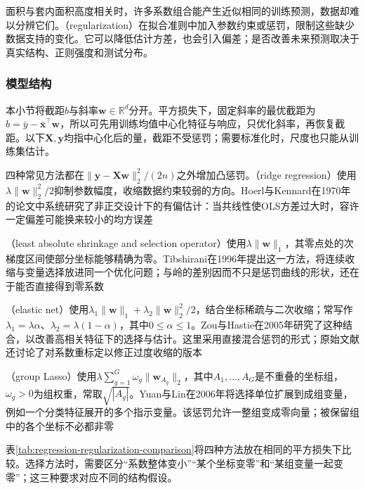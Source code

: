 面积与套内面积高度相关时，许多系数组合能产生近似相同的训练预测，数据却难以分辨它们。（regularization）在拟合准则中加入参数约束或惩罚，限制这些缺少数据支持的变化。它可以降低估计方差，也会引入偏差；是否改善未来预测取决于真实结构、正则强度和测试分布。

\subsubsection{模型结构}
\label{sec:regression-penalties}

本小节将截距$b$与斜率$\bm{w}\in\mathbb{R}^d$分开。平方损失下，固定斜率的最优截距为$b=\bar y-\bar{\bm{x}}^{\top}\bm{w}$，所以可先用训练均值中心化特征与响应，只优化斜率，再恢复截距。以下$\bm{X},\bm{y}$均指中心化后的量，截距不受惩罚；需要标准化时，尺度也只能从训练集估计。

四种常见方法都在$\lVert\bm{y}-\bm{X}\bm{w}\rVert_2^2/(2n)$之外增加凸惩罚。（ridge regression）使用$\lambda\lVert\bm{w}\rVert_2^2/2$抑制参数幅度，收缩数据约束较弱的方向。Hoerl与Kennard在1970年的论文中系统研究了非正交设计下的有偏估计：当共线性使OLS方差过大时，容许一定偏差可能换来较小的均方误差

（least absolute shrinkage and selection operator）使用$\lambda\lVert\bm{w}\rVert_1$，其零点处的次梯度区间使部分坐标能够精确为零。Tibshirani在1996年提出这一方法，将连续收缩与变量选择放进同一个优化问题；与岭的差别因而不只是惩罚曲线的形状，还在于能否直接得到零系数

（elastic net）使用$\lambda_1\lVert\bm{w}\rVert_1+\lambda_2\lVert\bm{w}\rVert_2^2/2$，结合坐标稀疏与二次收缩；常写作$\lambda_1=\lambda\alpha$、$\lambda_2=\lambda(1-\alpha)$，其中$0\leq\alpha\leq1$。Zou与Hastie在2005年研究了这种结合，以改善高相关特征下的选择与估计。这里采用直接混合惩罚的形式；原始文献还讨论了对系数重标定以修正过度收缩的版本

（group Lasso）使用$\lambda\sum_{g=1}^{G}\omega_g\lVert\bm{w}_{A_g}\rVert_2$，其中$A_1,\ldots,A_G$是不重叠的坐标组，$\omega_g>0$为组权重，常取$\sqrt{|A_g|}$。Yuan与Lin在2006年将选择单位扩展到成组变量，例如一个分类特征展开的多个指示变量。该惩罚允许一整组变成零向量；被保留组中的各个坐标不必都非零

表\ref{tab:regression-regularization-comparison}将四种方法放在相同的平方损失下比较。选择方法时，需要区分“系数整体变小”“某个坐标变零”和“某组变量一起变零”；这三种要求对应不同的结构假设。

